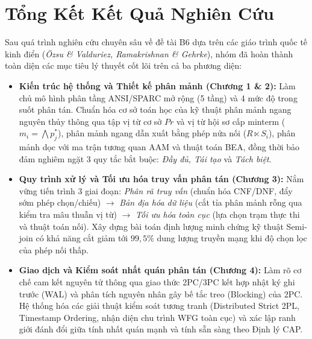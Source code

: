 \documentclass[12pt,a4paper]{report}
\begin{document}
\section{Tổng Kết Kết Quả Nghiên Cứu}
Sau quá trình nghiên cứu chuyên sâu về đề tài B6 dựa trên các giáo trình quốc tế kinh điển (\textit{Özsu \& Valduriez, Ramakrishnan \& Gehrke}), nhóm đã hoàn thành toàn diện các mục tiêu lý thuyết cốt lõi trên cả ba phương diện:

\begin{itemize}[leftmargin=0.8cm, topsep=2pt, itemsep=2pt]
    \item \textbf{Kiến trúc hệ thống và Thiết kế phân mảnh (Chương 1 \& 2):} 
    Làm chủ mô hình phân tầng ANSI/SPARC mở rộng (5 tầng) và 4 mức độ trong suốt phân tán. Chuẩn hóa cơ sở toán học của kỹ thuật phân mảnh ngang nguyên thủy thông qua tập vị từ cơ sở $Pr$ và vị từ hội sơ cấp minterm ($m_i = \bigwedge p_j^*$), phân mảnh ngang dẫn xuất bằng phép nửa nối ($R \ltimes S_i$), phân mảnh dọc với ma trận tương quan AAM và thuật toán BEA, đồng thời bảo đảm nghiêm ngặt 3 quy tắc bắt buộc: \textit{Đầy đủ, Tái tạo} và \textit{Tách biệt}.
    
    \item \textbf{Quy trình xử lý và Tối ưu hóa truy vấn phân tán (Chương 3):} 
    Nắm vững tiến trình 3 giai đoạn: \textit{Phân rã truy vấn} (chuẩn hóa CNF/DNF, đẩy sớm phép chọn/chiếu) $\rightarrow$ \textit{Bản địa hóa dữ liệu} (cắt tỉa phân mảnh rỗng qua kiểm tra mâu thuẫn vị từ) $\rightarrow$ \textit{Tối ưu hóa toàn cục} (lựa chọn trạm thực thi và thuật toán nối). Xây dựng bài toán định lượng minh chứng kỹ thuật Semi-join có khả năng cắt giảm tới $99,5\%$ dung lượng truyền mạng khi độ chọn lọc của phép nối thấp.
    
    \item \textbf{Giao dịch và Kiểm soát nhất quán phân tán (Chương 4):} 
    Làm rõ cơ chế cam kết nguyên tử thông qua giao thức 2PC/3PC kết hợp nhật ký ghi trước (WAL) và phân tích nguyên nhân gây bế tắc treo (Blocking) của 2PC. Hệ thống hóa các giải thuật kiểm soát tương tranh (Distributed Strict 2PL, Timestamp Ordering, nhận diện chu trình WFG toàn cục) và xác lập ranh giới đánh đổi giữa tính nhất quán mạnh và tính sẵn sàng theo Định lý CAP.
\end{itemize}
\end{document}

